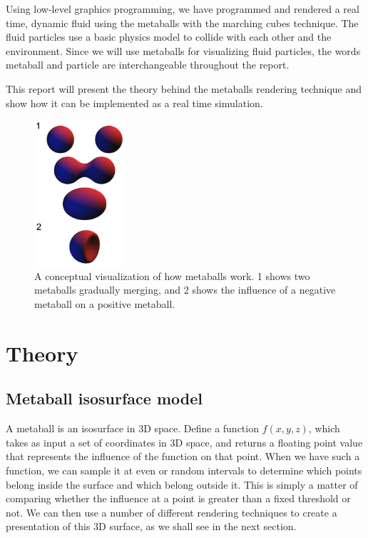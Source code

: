 \documentclass{article}
\begin{document}
\begin{multicols}{2}
		Using low-level graphics programming, we have programmed and rendered a real time, dynamic fluid using the metaballs with the marching cubes technique. The fluid particles use a basic physics model to collide with each other and the environment. Since we will use metaballs for visualizing fluid particles, the words metaball and particle are interchangeable throughout the report.
	
	    This report will present the theory behind the metaballs rendering technique and show how it can be implemented as a real time simulation. 
    
	    \begin{figure}[H]
	    	\centering
	    	\begin{minipage}[b]{0.5\textwidth}
	    		\centering
	    		\includegraphics[width=0.3\textwidth]{img/metaballs-concept.png}
	    		\caption{A conceptual visualization of how metaballs work. 1 shows two metaballs gradually merging, and 2 shows the influence of a negative metaball on a positive metaball. \cite{wiki07}}
	    		\label{fig:metaballs-concept}
	    	\end{minipage}
	    \end{figure}

    \section{Theory}

        \subsection{Metaball isosurface model}
            A metaball is an isosurface in 3D space. 
            Define a function $f(x,y,z)$, which takes as input a set of coordinates in 3D space, and returns a floating point value that represents the influence of the function on that point.
            When we have such a function, we can sample it at even or random intervals to determine which points belong inside the surface and which belong outside it.
            This is simply a matter of comparing whether the influence at a point is greater than a fixed threshold or not.
            We can then use a number of different rendering techniques to create a presentation of this 3D surface, as we shall see in the next section.


\end{multicols}
\end{document}
